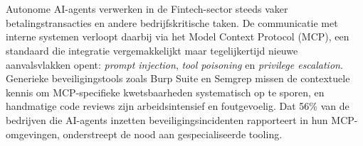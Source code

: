 
%
%
%
%
%

%



\chapter*{}

Autonome AI-agents verwerken in de Fintech-sector steeds vaker betalingstransacties en andere bedrijfskritische taken. De communicatie met interne systemen verloopt daarbij via het Model Context Protocol (MCP), een standaard die integratie vergemakkelijkt maar tegelijkertijd nieuwe aanvalsvlakken opent: \emph{prompt injection}, \emph{tool poisoning} en \emph{privilege escalation}. Generieke beveiligingstools zoals Burp Suite en Semgrep missen de contextuele kennis om MCP-specifieke kwetsbaarheden systematisch op te sporen, en handmatige code reviews zijn arbeidsintensief en foutgevoelig. Dat 56\% van de bedrijven die AI-agents inzetten beveiligingsincidenten rapporteert in hun MCP-omgevingen, onderstreept de nood aan gespecialiseerde tooling.

